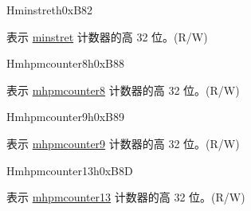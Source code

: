 \begin{register}{H}{minstreth}{0xB82}\label{regdesc:MINSTRETH}
%
\regnewline%
\begin{regdesc}\begin{reglist}
\label{fielddesc:MINSTRETH}\item [MINSTRETH] 表示 \hyperref[regdesc:MINSTRET]{minstret} 计数器的高 32 位。(R/W)
\end{reglist}\end{regdesc}
\end{register}

\begin{register}{H}{mhpmcounter8h}{0xB88}\label{regdesc:MHPMCOUNTER8H}
%
\regnewline%
\begin{regdesc}\begin{reglist}
\label{fielddesc:MHPMCOUNTER8H}\item [MHPMCOUNTER8H] 表示 \hyperref[regdesc:MHPMCOUNTER8]{mhpmcounter8} 计数器的高 32 位。(R/W)
\end{reglist}\end{regdesc}
\end{register}

\begin{register}{H}{mhpmcounter9h}{0xB89}\label{regdesc:MHPMCOUNTER9H}
%
\regnewline%
\begin{regdesc}\begin{reglist}
\label{fielddesc:MHPMCOUNTER9H}\item [MHPMCOUNTER9H] 表示 \hyperref[regdesc:MHPMCOUNTER9]{mhpmcounter9} 计数器的高 32 位。(R/W)
\end{reglist}\end{regdesc}
\end{register}

\begin{register}{H}{mhpmcounter13h}{0xB8D}\label{regdesc:MHPMCOUNTER13H}
%
\regnewline%
\begin{regdesc}\begin{reglist}
\label{fielddesc:MHPMCOUNTER13H}\item [MHPMCOUNTER13H] 表示 \hyperref[regdesc:MHPMCOUNTER13]{mhpmcounter13} 计数器的高 32 位。(R/W)
\end{reglist}\end{regdesc}
\end{register}







